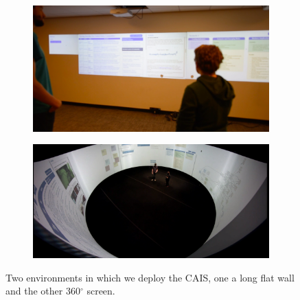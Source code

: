 \begin{figure}
\centering
    \begin{subfigure}[b]{.47\linewidth}
        \includegraphics[width=\linewidth]{chapters/02_technology/figures/env_wall.png}
    \end{subfigure}
    \begin{subfigure}[b]{.48\linewidth}
        \includegraphics[width=\linewidth]{chapters/02_technology/figures/env_360.png}
    \end{subfigure}
    \caption{Two environments in which we deploy the CAIS, one a long flat wall and the other 360$^{\circ}$ screen.}
    \label{fig:cais_environments}
\end{figure}